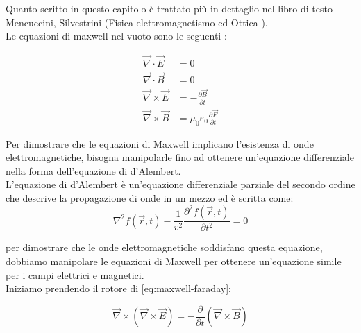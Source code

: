 
Quanto scritto in questo capitolo è trattato più in dettaglio nel libro di testo Mencuccini, Silvestrini (Fisica elettromagnetismo ed Ottica \cite{mencuccini2016fisII}).\\
Le equazioni di maxwell nel vuoto sono le seguenti :

\begin{subequations}\label{eq:maxwell}
\begin{align}
\vec{\nabla} \cdot \vec{E} &= 0 \label{eq:maxwell-gauss-e}\\
\vec{\nabla} \cdot \vec{B} &= 0 \label{eq:maxwell-gauss-b}\\
\vec{\nabla} \times \vec{E} &= -\frac{\partial \vec{B}}{\partial t} \label{eq:maxwell-faraday}\\
\vec{\nabla} \times \vec{B} &= \mu_0 \varepsilon_0 \frac{\partial \vec{E}}{\partial t} \label{eq:maxwell-ampere}
\end{align}
\end{subequations}

Per dimostrare che le equazioni di Maxwell implicano l'esistenza di onde elettromagnetiche, bisogna manipolarle fino ad ottenere 
un'equazione differenziale nella forma dell'equazione di d'Alembert.\\
L'equazione di d'Alembert è un'equazione differenziale parziale del secondo ordine che descrive la propagazione di onde in un mezzo ed è scritta come:
\begin{equation}
    \nabla^2 f(\vec{r},t) - \frac{1}{v^2}\frac{\partial^2 f(\vec{r},t)}{\partial t^2} = 0
\end{equation}

per dimostrare che le onde elettromagnetiche soddisfano questa equazione, dobbiamo manipolare le equazioni di Maxwell per ottenere un'equazione simile per i campi elettrici e magnetici.\\
Iniziamo prendendo il rotore di \eqref{eq:maxwell-faraday}:

\begin{equation}\label{eq:maxwellxrotor}
\vec{\nabla} \times (\vec{\nabla} \times \vec{E}) = -\frac{\partial}{\partial t} (\vec{\nabla} \times \vec{B})
\end{equation}


